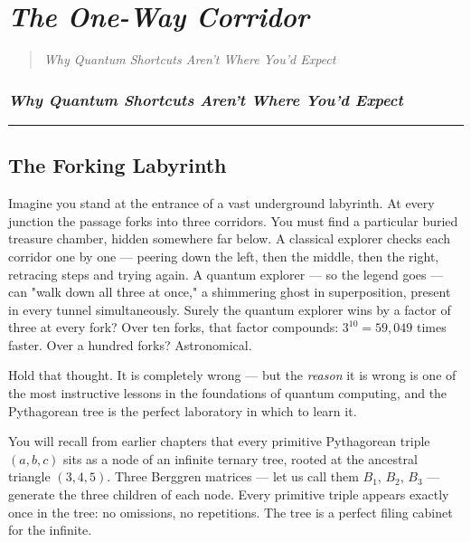 \documentclass[11pt,openany]{book}
\theoremstyle{definition}
\theoremstyle{plain}
\theoremstyle{remark}
\begin{document}
\clearpage

\chapter{\textit{The One-Way Corridor}}
\begin{quote}\textit{Why Quantum Shortcuts Aren't Where You'd Expect}\end{quote}



\subsection*{\textit{Why Quantum Shortcuts Aren't Where You'd Expect}}


\bigskip\noindent\rule{\textwidth}{0.4pt}\bigskip


\section*{The Forking Labyrinth}


Imagine you stand at the entrance of a vast underground labyrinth. At every junction the passage forks into three corridors. You must find a particular buried treasure chamber, hidden somewhere far below. A classical explorer checks each corridor one by one — peering down the left, then the middle, then the right, retracing steps and trying again. A quantum explorer — so the legend goes — can "walk down all three at once," a shimmering ghost in superposition, present in every tunnel simultaneously. Surely the quantum explorer wins by a factor of three at every fork? Over ten forks, that factor compounds: $3^{10} = 59{,}049$ times faster. Over a hundred forks? Astronomical.

Hold that thought. It is completely wrong — but the \textit{reason} it is wrong is one of the most instructive lessons in the foundations of quantum computing, and the Pythagorean tree is the perfect laboratory in which to learn it.

You will recall from earlier chapters that every primitive Pythagorean triple $(a, b, c)$ sits as a node of an infinite ternary tree, rooted at the ancestral triangle $(3, 4, 5)$. Three Berggren matrices — let us call them $B_1$, $B_2$, $B_3$ — generate the three children of each node. Every primitive triple appears exactly once in the tree: no omissions, no repetitions. The tree is a perfect filing cabinet for the infinite.
\end{document}
